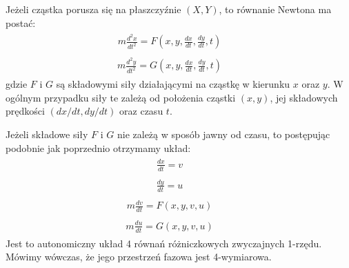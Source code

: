 \documentclass[a4paper,12pt,polish]{sphinxmanual}
\begin{document}
Jeżeli cząstka porusza się na płaszczyźnie $(X, Y)$, to równanie Newtona ma postać:
\label{ch1/chI011:equation-eqn9}\begin{gather}
\begin{split} m  \frac{d^2x}{dt^2} = F\left(x, y, \frac{dx}{dt}, \frac{dy}{dt}, t\right) \qquad\end{split}\label{ch1/chI011-eqn9}
\end{gather}\label{ch1/chI011:equation-eqn10}\begin{gather}
\begin{split} m  \frac{d^2y}{dt^2} = G\left(x, y, \frac{dx}{dt}, \frac{dy}{dt}, t\right) \qquad\end{split}\label{ch1/chI011-eqn10}
\end{gather}
gdzie $F$  i  $G$  są składowymi siły działającymi  na cząstkę w kierunku $x$ oraz $y$. W ogólnym przypadku siły te zależą od położenia cząstki $(x, y)$, jej składowych prędkości $(dx/dt, dy/dt)$ oraz czasu $t$.

Jeżeli składowe siły $F$  i $G$  nie zależą w sposób jawny od czasu, to postępując podobnie jak poprzednio otrzymamy układ:
\label{ch1/chI011:equation-eqn11}\begin{gather}
\begin{split}\frac{dx}{dt} = v \qquad\end{split}\label{ch1/chI011-eqn11}
\end{gather}\label{ch1/chI011:equation-eqn12}\begin{gather}
\begin{split}\frac{dy}{dt} = u \qquad\end{split}\label{ch1/chI011-eqn12}
\end{gather}\label{ch1/chI011:equation-eqn13}\begin{gather}
\begin{split} m  \frac{dv}{dt} = F(x, y, v, u) \qquad\end{split}\label{ch1/chI011-eqn13}
\end{gather}\label{ch1/chI011:equation-eqn14}\begin{gather}
\begin{split} m  \frac{du}{dt} = G(x, y, v, u ) \qquad\end{split}\label{ch1/chI011-eqn14}
\end{gather}
Jest to autonomiczny układ 4 równań różniczkowych zwyczajnych 1-rzędu. Mówimy wówczas, że jego przestrzeń fazowa jest 4-wymiarowa.
\end{document}
